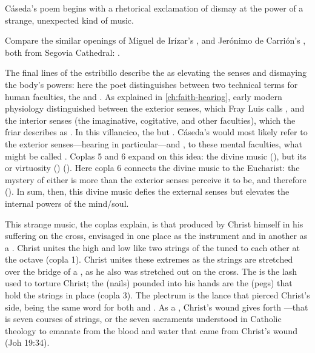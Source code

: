 Cáseda's poem begins with a rhetorical exclamation of dismay at the power of a
strange, unexpected kind of music.%
\begin{Footnote}
    Compare the similar openings of Miguel de Irízar's , and Jerónimo de Carrión's ,
    both from Segovia Cathedral: \autocite[\XXX]{Cashner:PhD}.
\end{Footnote}
The final lines of the estribillo describe the  as
elevating the senses and dismaying the body's powers: here the poet
distinguishes between two technical terms for human faculties, the
 and .
As explained in \cref{ch:faith-hearing}, early modern physiology distinguished
between the exterior senses, which Fray Luis calls , and the interior senses (the imaginative, cogitative, and other
faculties), which the friar describes as .
In this villancico, the   but
.  
Cáseda's  would most likely refer to the exterior
senses---hearing in particular---and , to these mental
faculties, what might be called .
Coplas 5 and 6 expand on this idea: the divine music  (), but its  or virtuosity
() 
().
Here copla 6 connects the divine music to the Eucharist: the mystery of either
is more than the exterior senses perceive it to be, and therefore
().
In sum, then, this divine music defies the external senses but elevates the
internal powers of the mind/soul.


This strange music, the coplas explain, is that produced by Christ himself in
his suffering on the cross, envisaged in one place as the instrument
 and in another as a .
Christ unites the high and low like two strings of the  tuned to
each other at the octave (copla 1).  
Christ unites these extremes as the strings are stretched over the bridge of a
, as he also was stretched out on the cross.
The  is the lash used to torture Christ; the 
(nails) pounded into his hands are the  (pegs) that hold the
strings in place (copla 3).
The plectrum is the lance that pierced Christ's side,  being the
same word for both  and .
As a , Christ's wound gives forth ---that is
seven courses of strings, or the seven sacraments understood in Catholic
theology to emanate from the blood and water that came from Christ's wound (Joh
19:34).

